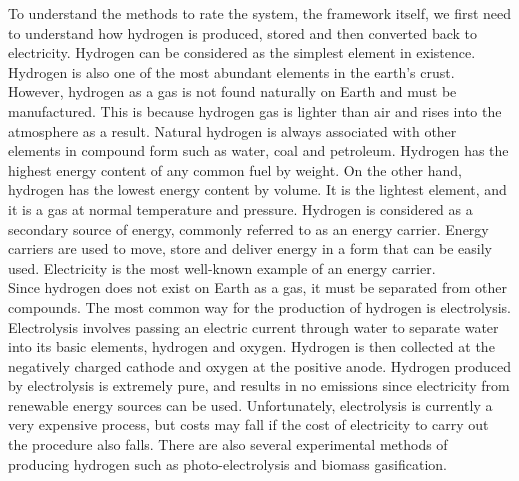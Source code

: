 \documentclass[12pt,a4paper]{article}
\begin{document}
\begin{parcolumns}[colwidths={1=2.5 cm, 2=10 cm, 3=2.5cm}]{3}
{To understand the methods to rate the system, the framework itself, we first need to understand how hydrogen is produced, stored and then converted back to electricity. Hydrogen can be considered as the simplest element in existence. Hydrogen is also one of the most abundant elements in the earth’s crust. However, hydrogen as a gas is not found naturally on Earth and must be manufactured. This is because hydrogen gas is lighter than air and rises into the atmosphere as a result. Natural hydrogen is always associated with other elements in compound form such as water, coal and petroleum. Hydrogen has the highest energy content of any common fuel by weight. On the other hand, hydrogen has the lowest energy content by volume. It is the lightest element, and it is a gas at normal temperature and pressure. Hydrogen is considered as a secondary source of energy, commonly referred to as an energy carrier. Energy carriers are used to move, store and deliver energy in a form that can be easily used. Electricity is the most well-known example of an energy carrier. \\

Since hydrogen does not exist on Earth as a gas, it must be separated from other compounds. The most common way for the production of hydrogen is electrolysis. Electrolysis involves passing an electric current through water to separate water into its basic elements, hydrogen and oxygen. Hydrogen is then collected at the negatively charged cathode and oxygen at the positive anode. Hydrogen produced by electrolysis is extremely pure, and results in no emissions since electricity from renewable energy sources can be used. Unfortunately, electrolysis is currently a very expensive process, but costs may fall if the cost of electricity to carry out the procedure also falls. There are also several experimental methods of producing hydrogen such as photo-electrolysis and biomass gasification. \\

}
\end{parcolumns}
\end{document}

